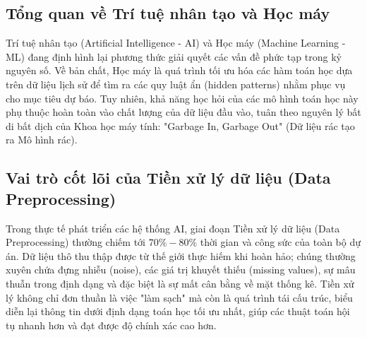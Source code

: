 \subsection{Tổng quan về Trí tuệ nhân tạo và Học máy}
Trí tuệ nhân tạo (Artificial Intelligence - AI) và Học máy (Machine Learning - ML) đang định hình lại phương thức giải quyết các vấn đề phức tạp trong kỷ nguyên số. Về bản chất, Học máy là quá trình tối ưu hóa các hàm toán học dựa trên dữ liệu lịch sử để tìm ra các quy luật ẩn (hidden patterns) nhằm phục vụ cho mục tiêu dự báo. Tuy nhiên, khả năng học hỏi của các mô hình toán học này phụ thuộc hoàn toàn vào chất lượng của dữ liệu đầu vào, tuân theo nguyên lý bất di bất dịch của Khoa học máy tính: "Garbage In, Garbage Out" (Dữ liệu rác tạo ra Mô hình rác).

\subsection{Vai trò cốt lõi của Tiền xử lý dữ liệu (Data Preprocessing)}
Trong thực tế phát triển các hệ thống AI, giai đoạn Tiền xử lý dữ liệu (Data Preprocessing) thường chiếm tới $70\% - 80\%$ thời gian và công sức của toàn bộ dự án. Dữ liệu thô thu thập được từ thế giới thực hiếm khi hoàn hảo; chúng thường xuyên chứa đựng nhiễu (noise), các giá trị khuyết thiếu (missing values), sự mâu thuẫn trong định dạng và đặc biệt là sự mất cân bằng về mặt thống kê. Tiền xử lý không chỉ đơn thuần là việc "làm sạch" mà còn là quá trình tái cấu trúc, biểu diễn lại thông tin dưới định dạng toán học tối ưu nhất, giúp các thuật toán hội tụ nhanh hơn và đạt được độ chính xác cao hơn.


